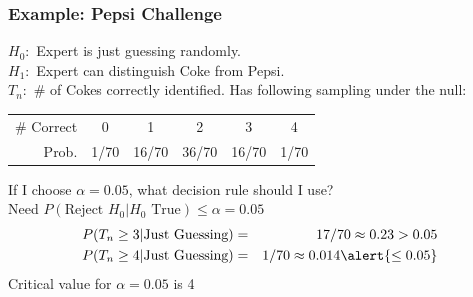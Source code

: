\documentclass[handout]{beamer}
\begin{document}
\begin{frame}
\frametitle{Example: Pepsi Challenge}
\footnotesize 
$H_0\colon$ Expert is just guessing randomly.\\
$H_1\colon$ Expert can distinguish Coke from Pepsi.\\
$T_n\colon$ \# of Cokes correctly identified. Has following sampling under the null:
		\begin{center}
		\begin{tabular}{rccccc}
		\hline \footnotesize
		\# Correct & 0 & 1 & 2 & 3 & 4\\
		Prob.&1/70 & 16/70 & 36/70 & 16/70 &1/70\\
		\hline
		\end{tabular}
	\end{center}
	\vspace{2em}
	\normalsize
	\alert{If I choose $\alpha =0.05$, what decision rule should I use?}\\
\vspace{1em}
	Need $P(\mbox{Reject } H_0|H_0 \mbox{ True})\leq \alpha = 0.05$ 
	\begin{eqnarray*}
		P(T_n \geq 3 |\mbox{Just Guessing}) &=& 17/70 \approx 0.23 > 0.05 \\
	P(T_n \geq 4 |\mbox{Just Guessing}) &=& 1/70  \approx 0.014 \alert{\leq 0.05}
	\end{eqnarray*}
	\vspace{1em}
	\alert{Critical value for $\alpha = 0.05$ is 4}
\end{frame}
\end{document}
